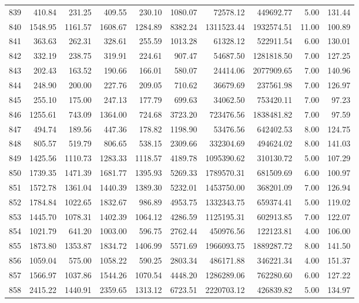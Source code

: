 \begin{tabular}{lrrrrrrrrr}
839 & 410.84 & 231.25 & 409.55 & 230.10 & 1080.07 & 72578.12 & 449692.77 & 5.00 & 131.44 \\
840 & 1548.95 & 1161.57 & 1608.67 & 1284.89 & 8382.24 & 1311523.44 & 1932574.51 & 11.00 & 100.89 \\
841 & 363.63 & 262.31 & 328.61 & 255.59 & 1013.28 & 61328.12 & 522911.54 & 6.00 & 130.01 \\
842 & 332.19 & 238.75 & 319.91 & 224.61 & 907.47 & 54687.50 & 1281818.50 & 7.00 & 127.25 \\
843 & 202.43 & 163.52 & 190.66 & 166.01 & 580.07 & 24414.06 & 2077909.65 & 7.00 & 140.96 \\
844 & 248.90 & 200.00 & 227.76 & 209.05 & 710.62 & 36679.69 & 237561.98 & 7.00 & 126.97 \\
845 & 255.10 & 175.00 & 247.13 & 177.79 & 699.63 & 34062.50 & 753420.11 & 7.00 & 97.23 \\
846 & 1255.61 & 743.09 & 1364.00 & 724.68 & 3723.20 & 723476.56 & 1838481.82 & 7.00 & 97.59 \\
847 & 494.74 & 189.56 & 447.36 & 178.82 & 1198.90 & 53476.56 & 642402.53 & 8.00 & 124.75 \\
848 & 805.57 & 519.79 & 806.65 & 538.15 & 2309.66 & 332304.69 & 494624.02 & 8.00 & 141.03 \\
849 & 1425.56 & 1110.73 & 1283.33 & 1118.57 & 4189.78 & 1095390.62 & 310130.72 & 5.00 & 107.29 \\
850 & 1739.35 & 1471.39 & 1681.77 & 1395.93 & 5269.33 & 1789570.31 & 681509.69 & 6.00 & 100.97 \\
851 & 1572.78 & 1361.04 & 1440.39 & 1389.30 & 5232.01 & 1453750.00 & 368201.09 & 7.00 & 126.94 \\
852 & 1784.84 & 1022.65 & 1832.67 & 986.89 & 4953.75 & 1332343.75 & 659374.41 & 5.00 & 119.02 \\
853 & 1445.70 & 1078.31 & 1402.39 & 1064.12 & 4286.59 & 1125195.31 & 602913.85 & 7.00 & 122.07 \\
854 & 1021.79 & 641.20 & 1003.00 & 596.75 & 2762.44 & 450976.56 & 122123.81 & 4.00 & 106.00 \\
855 & 1873.80 & 1353.87 & 1834.72 & 1406.99 & 5571.69 & 1966093.75 & 1889287.72 & 8.00 & 141.50 \\
856 & 1059.04 & 575.00 & 1058.22 & 590.25 & 2803.34 & 486171.88 & 346221.34 & 4.00 & 151.37 \\
857 & 1566.97 & 1037.86 & 1544.26 & 1070.54 & 4448.20 & 1286289.06 & 762280.60 & 6.00 & 127.22 \\
858 & 2415.22 & 1440.91 & 2359.65 & 1313.12 & 6723.51 & 2220703.12 & 426839.82 & 5.00 & 134.97 \\

\end{tabular}
